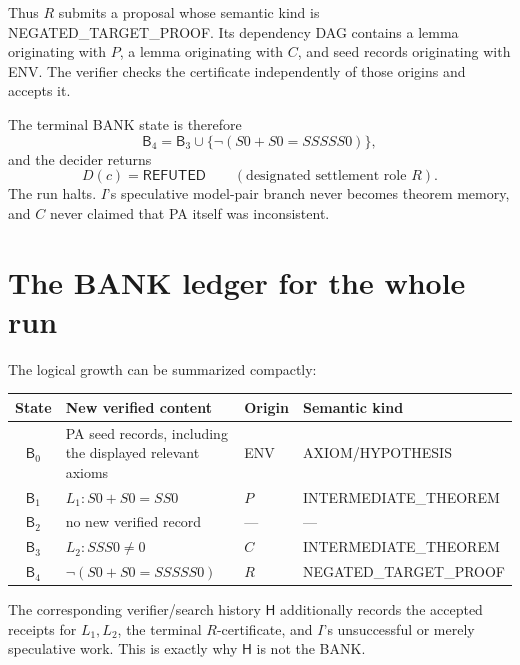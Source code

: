 \documentclass[11pt,openany]{book}
\theoremstyle{definition}
\theoremstyle{remark}
\newcommand{\Bank}{\mathsf{B}}
\newcommand{\Hist}{\mathsf{H}}
\begin{document}
Thus $R$ submits a proposal whose semantic kind is \textsf{NEGATED\_TARGET\_PROOF}. Its dependency DAG contains a lemma originating with $P$, a lemma originating with $C$, and seed records originating with \textsf{ENV}. The verifier checks the certificate independently of those origins and accepts it.

The terminal BANK state is therefore
\[
\Bank_4
=\Bank_3\cup
\bigl\{\neg(S0+S0=SSSSS0)\bigr\},
\]
and the decider returns
\[
\boxed{D(c)=\textsf{REFUTED}\qquad(\text{designated settlement role }R).}
\]
The run halts. $I$'s speculative model-pair branch never becomes theorem memory, and $C$ never claimed that PA itself was inconsistent.

\section{The BANK ledger for the whole run}
The logical growth can be summarized compactly:
\begin{center}
\begin{tabularx}{0.96\textwidth}{@{}cXll@{}}
\toprule
\textbf{State} & \textbf{New verified content} & \textbf{Origin} & \textbf{Semantic kind}\\
\midrule
$\Bank_0$ & PA seed records, including the displayed relevant axioms & \textsf{ENV} & \textsf{AXIOM/HYPOTHESIS}\\
$\Bank_1$ & $L_1:S0+S0=SS0$ & $P$ & \textsf{INTERMEDIATE\_THEOREM}\\
$\Bank_2$ & no new verified record & --- & ---\\
$\Bank_3$ & $L_2:SSS0\neq0$ & $C$ & \textsf{INTERMEDIATE\_THEOREM}\\
$\Bank_4$ & $\neg(S0+S0=SSSSS0)$ & $R$ & \textsf{NEGATED\_TARGET\_PROOF}\\
\bottomrule
\end{tabularx}
\end{center}

The corresponding verifier/search history $\Hist$ additionally records the accepted receipts for $L_1,L_2$, the terminal $R$-certificate, and $I$'s unsuccessful or merely speculative work. This is exactly why $\Hist$ is not the BANK.
\end{document}
